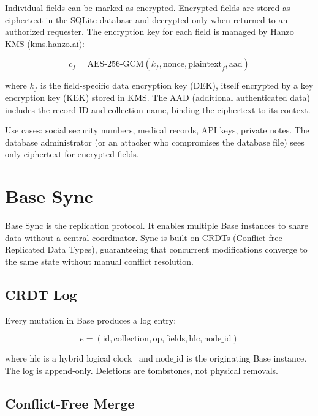\documentclass[11pt]{article}
\begin{document}
Individual fields can be marked as encrypted. Encrypted fields are stored as
ciphertext in the SQLite database and decrypted only when returned to an
authorized requester. The encryption key for each field is managed by
Hanzo KMS (kms.hanzo.ai):

\begin{equation}
c_f = \text{AES-256-GCM}(k_f, \text{nonce}, \text{plaintext}_f, \text{aad})
\end{equation}

where $k_f$ is the field-specific data encryption key (DEK), itself encrypted
by a key encryption key (KEK) stored in KMS. The AAD (additional authenticated
data) includes the record ID and collection name, binding the ciphertext to
its context.

Use cases: social security numbers, medical records, API keys, private notes.
The database administrator (or an attacker who compromises the database file)
sees only ciphertext for encrypted fields.

\section{Base Sync}
\label{sec:sync}

Base Sync is the replication protocol. It enables multiple Base instances to
share data without a central coordinator. Sync is built on CRDTs
(Conflict-free Replicated Data Types), guaranteeing that concurrent
modifications converge to the same state without manual conflict resolution.

\subsection{CRDT Log}

Every mutation in Base produces a log entry:

\begin{equation}
e = (\text{id}, \text{collection}, \text{op}, \text{fields}, \text{hlc}, \text{node\_id})
\end{equation}

where $\text{hlc}$ is a hybrid logical clock~\cite{kulkarni2014hlc} and
$\text{node\_id}$ is the originating Base instance. The log is append-only.
Deletions are tombstones, not physical removals.

\subsection{Conflict-Free Merge}
\end{document}
